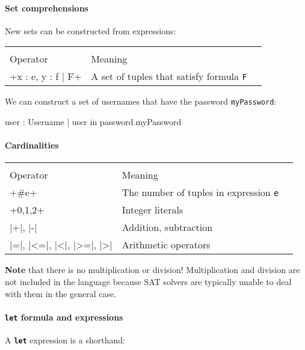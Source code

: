 \paragraph{Set comprehensions}
New sets can be constructed from expressions:

\begin{center}
\begin{tabular}{lll}
\toprule
          &         \\
 Operator & Meaning \\
\midrule
 \A+{x : e, y : f | F}+ & A set of tuples that satisfy formula \texttt{F}\\
\bottomrule
\end{tabular}
\end{center}

We can construct a set of usernames that have the password \texttt{myPassword}:

\begin{alloy}
  {user : Username | user in password.myPassword}
\end{alloy}

\paragraph{Cardinalities}

\begin{center}
\begin{tabular}{lll}
\toprule
          &         \\
 Operator & Meaning \\
\midrule
 \A+#e+ & The number of tuples in expression \texttt{e}\\
 \A+0,1,2+ & Integer literals\\
 \A|+|, \A|-|  & Addition, subtraction\\
 \A|=|, \A|<=|, \A|<|, \A|>=|, \A|>|  & Arithmetic operators\\
\bottomrule
\end{tabular}
\end{center}

\textbf{Note} that there is no multiplication or division! Multiplication and division are not included in the language because SAT solvers are typically unable to deal with them in the general case.

\paragraph{\texttt{let} formula and expressions}
A \texttt{\textbf{let}} expression is a shorthand:

